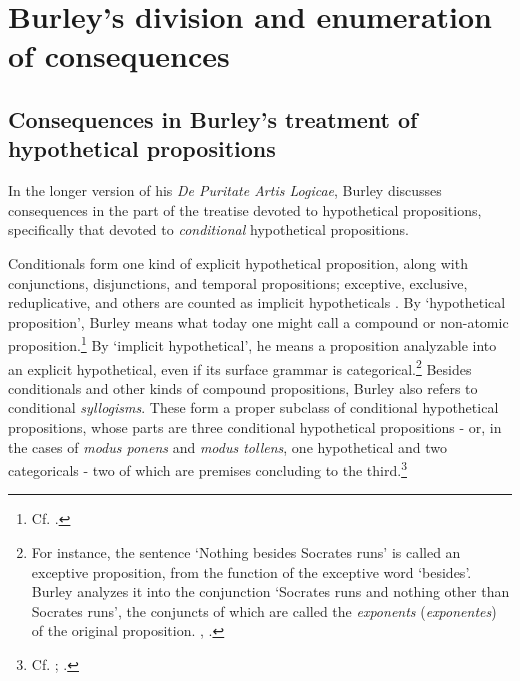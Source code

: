 \documentclass[]{birkjour}
\begin{document}
\section{Burley's division and enumeration of consequences}
\subsection{Consequences in Burley's treatment of hypothetical propositions}
In the longer version of his \textit{De Puritate Artis Logicae}, Burley discusses consequences in the part of the treatise devoted to hypothetical propositions, specifically that devoted to \textit{conditional} hypothetical propositions.

Conditionals form one kind of explicit hypothetical proposition, along with conjunctions, disjunctions, and temporal propositions; exceptive, exclusive, reduplicative, and others are counted as implicit hypotheticals \autocite[pp. 106-107]{BurleyDPAL}. By `hypothetical proposition', Burley means what today one might call a compound or non-atomic proposition.\footnote{Cf. \cite[p. 66]{Buridan2015}.} By `implicit hypothetical', he means a proposition analyzable into an explicit hypothetical, even if its surface grammar is categorical.\footnote{For instance, the sentence `Nothing besides Socrates runs' is called an exceptive proposition, from the function of the exceptive word `besides'. Burley analyzes it into the conjunction `Socrates runs and nothing other than Socrates runs', the conjuncts of which are called the \textit{exponents} (\textit{exponentes}) of the original proposition. \autocite[p. 121, par. 44]{Green-Pedersen1980b}, \autocite[pp. 164-165]{BurleyDPAL}.} Besides conditionals and other kinds of compound propositions, Burley also refers to conditional \textit{syllogisms}. These form a proper subclass of conditional hypothetical propositions, whose parts are three conditional hypothetical propositions - or, in the cases of \textit{modus ponens} and \textit{modus tollens}, one hypothetical and two categoricals - two of which are premises concluding to the third.\footnote{Cf. \cite[5.1.3, pp. 308-309]{BuridanKlimaSD}; \cite{Klima2004b}.}
\end{document}
